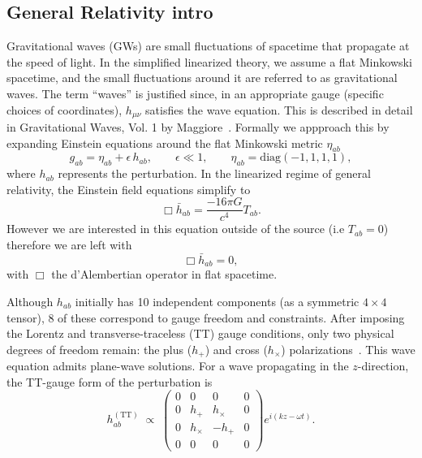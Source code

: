 \documentclass[12pt]{article}
\begin{document}
\subsection{General Relativity intro}
\label{sec:GRintro}
Gravitational waves (GWs) are small fluctuations of spacetime that propagate at the speed of light. In the simplified linearized theory, we assume a flat Minkowski spacetime, and the small fluctuations around it are referred to as gravitational waves. The term ``waves'' is justified since, in an appropriate gauge (specific choices of coordinates), \(h_{\mu\nu}\) satisfies the wave equation. This is described in detail in Gravitational Waves, Vol. 1 by Maggiore~\cite[Sec~ 1.1]{GRbook}.
Formally we appproach this by expanding Einstein equations around the flat Minkowski metric $\eta _{a b}$ 
\begin{equation}
g_{ab} = \eta_{ab} + \epsilon\,h_{ab},
\qquad
\epsilon \ll 1,
\qquad
\eta_{ab} = \mathrm{diag}(-1, 1, 1, 1),
\end{equation}
where \(h_{ab}\) represents the perturbation. In the linearized regime of general relativity, the Einstein field equations simplify to
\begin{equation}
    \Box \bar{h}_{ab} = \frac{-16\pi G}{c^4} T_{ab}.
\end{equation}
However we are interested in this equation outside of the source (i.e $T_{ab} =0$) therefore we are left with 
\begin{equation}
    \Box \bar{h}_{ab} = 0, 
\end{equation}
with \(\Box\) the d’Alembertian operator in flat spacetime.
%

Although \(h_{ab}\) initially has 10 independent components (as a symmetric $4 \times 4$ tensor), 8 of these correspond to gauge freedom and constraints. After imposing the Lorentz and transverse-traceless (TT) gauge conditions, only two physical degrees of freedom remain: the plus (\(h_+\)) and cross (\(h_\times\)) polarizations~\cite[Sec.~1.2]{GRbook}.
This wave equation admits plane-wave solutions. For a wave propagating in the \(z\)-direction, the TT-gauge form of the perturbation is
\begin{equation}
h_{ab}^{(\mathrm{TT})} \;\propto\;
\begin{pmatrix}
0 & 0 & 0 & 0 \\
0 & h_+ & h_\times & 0 \\
0 & h_\times & -h_+ & 0 \\
0 & 0 & 0 & 0
\end{pmatrix}
e^{i(kz-\omega t)}.
\end{equation}
\end{document}
